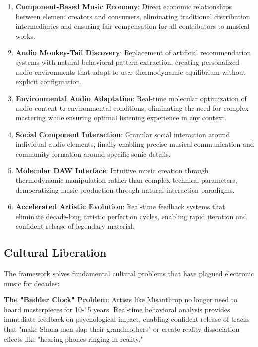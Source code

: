 \documentclass[12pt,a4paper]{article}
\begin{document}
\begin{enumerate}
\item \textbf{Component-Based Music Economy}: Direct economic relationships between element creators and consumers, eliminating traditional distribution intermediaries and ensuring fair compensation for all contributors to musical works.

\item \textbf{Audio Monkey-Tail Discovery}: Replacement of artificial recommendation systems with natural behavioral pattern extraction, creating personalized audio environments that adapt to user thermodynamic equilibrium without explicit configuration.

\item \textbf{Environmental Audio Adaptation}: Real-time molecular optimization of audio content to environmental conditions, eliminating the need for complex mastering while ensuring optimal listening experience in any context.

\item \textbf{Social Component Interaction}: Granular social interaction around individual audio elements, finally enabling precise musical communication and community formation around specific sonic details.

\item \textbf{Molecular DAW Interface}: Intuitive music creation through thermodynamic manipulation rather than complex technical parameters, democratizing music production through natural interaction paradigms.

\item \textbf{Accelerated Artistic Evolution}: Real-time feedback systems that eliminate decade-long artistic perfection cycles, enabling rapid iteration and confident release of legendary material.
\end{enumerate}

\subsection{Cultural Liberation}

The framework solves fundamental cultural problems that have plagued electronic music for decades:

\textbf{The "Badder Clock" Problem}: Artists like Misanthrop no longer need to hoard masterpieces for 10-15 years. Real-time behavioral analysis provides immediate feedback on psychological impact, enabling confident release of tracks that "make Shona men slap their grandmothers" or create reality-dissociation effects like "hearing phones ringing in reality."
\end{document}
